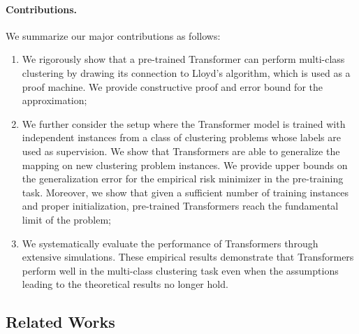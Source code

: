 \paragraph{Contributions.} We summarize our major contributions as follows:
\begin{enumerate}
    \item We rigorously show that a pre-trained Transformer can perform multi-class clustering by drawing its connection to Lloyd's algorithm, which is used as a proof machine. We provide constructive proof and error bound for the approximation;
    \item We further consider the setup where the Transformer model is trained with independent instances from a class of clustering problems whose labels are used as supervision. We show that Transformers are able to generalize the mapping on new clustering problem instances. We provide upper bounds on the generalization error for the empirical risk minimizer in the pre-training task. Moreover, we show that given a sufficient number of training instances and proper initialization, pre-trained Transformers reach the fundamental limit of the problem;
    \item We systematically evaluate the performance of Transformers through extensive simulations. These empirical results demonstrate that Transformers perform well in the multi-class clustering task even when the assumptions leading to the theoretical results no longer hold.
\end{enumerate}

\subsection{Related Works}
